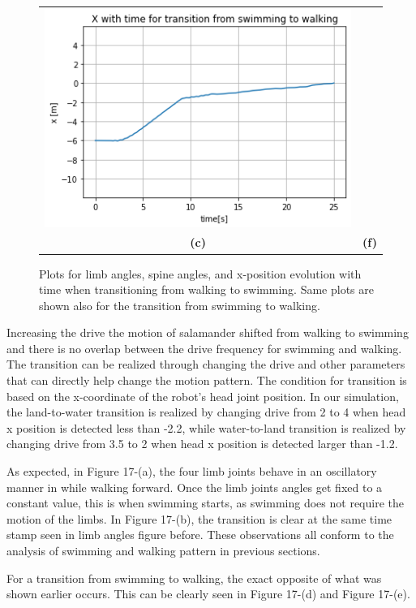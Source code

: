\documentclass{cmc}
\begin{document}
\begin{figure}[H]
\begin{tabular}{cc}
\includegraphics[height=0.3\columnwidth]{figures/8g_3_x.png} \\
\textbf{(c)} & \textbf{(f)}
\end{tabular}
\caption{Plots for limb angles, spine angles, and x-position evolution with time when transitioning from walking to swimming. Same plots are shown also for the transition from swimming to walking.}
\label{c}
\end{figure}

Increasing the drive the motion of salamander shifted from walking to swimming and there is no overlap between the drive frequency for swimming and walking. 
The transition can be realized through changing the drive and other parameters that can directly help change the motion pattern. The condition for transition is based on the x-coordinate of the robot's head joint position. In our simulation, the land-to-water transition is realized by changing drive from 2 to 4 when head x  position is detected less than -2.2, while water-to-land transition is realized by changing drive from 3.5 to 2 when head x position is detected larger than -1.2.

As expected, in Figure 17-(a), the four limb joints behave in an oscillatory manner in while walking forward. Once the limb joints angles get fixed to a constant value, this is when swimming starts, as swimming does not require the motion of the limbs. In Figure 17-(b), the transition is clear at the same time stamp seen in limb angles figure before. These observations all conform to the analysis of swimming and walking pattern in previous sections.

For a transition from swimming to walking, the exact opposite of what was shown earlier occurs. This can be clearly seen in Figure 17-(d) and Figure 17-(e).  
\end{document}
